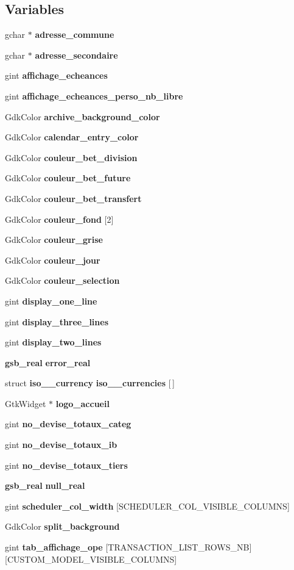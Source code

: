 \subsection*{Variables}
\begin{DoxyCompactItemize}
\item 
gchar $\ast$ {\bf adresse\_\-commune}
\item 
gchar $\ast$ {\bf adresse\_\-secondaire}
\item 
gint {\bf affichage\_\-echeances}
\item 
gint {\bf affichage\_\-echeances\_\-perso\_\-nb\_\-libre}
\item 
GdkColor {\bf archive\_\-background\_\-color}
\item 
GdkColor {\bf calendar\_\-entry\_\-color}
\item 
GdkColor {\bf couleur\_\-bet\_\-division}
\item 
GdkColor {\bf couleur\_\-bet\_\-future}
\item 
GdkColor {\bf couleur\_\-bet\_\-transfert}
\item 
GdkColor {\bf couleur\_\-fond} [2]
\item 
GdkColor {\bf couleur\_\-grise}
\item 
GdkColor {\bf couleur\_\-jour}
\item 
GdkColor {\bf couleur\_\-selection}
\item 
gint {\bf display\_\-one\_\-line}
\item 
gint {\bf display\_\-three\_\-lines}
\item 
gint {\bf display\_\-two\_\-lines}
\item 
{\bf gsb\_\-real} {\bf error\_\-real}
\item 
struct {\bf iso\_\_\-currency} {\bf iso\_\_\-currencies} [$\,$]
\item 
GtkWidget $\ast$ {\bf logo\_\-accueil}
\item 
gint {\bf no\_\-devise\_\-totaux\_\-categ}
\item 
gint {\bf no\_\-devise\_\-totaux\_\-ib}
\item 
gint {\bf no\_\-devise\_\-totaux\_\-tiers}
\item 
{\bf gsb\_\-real} {\bf null\_\-real}
\item 
gint {\bf scheduler\_\-col\_\-width} [SCHEDULER\_\-COL\_\-VISIBLE\_\-COLUMNS]
\item 
GdkColor {\bf split\_\-background}
\item 
gint {\bf tab\_\-affichage\_\-ope} [TRANSACTION\_\-LIST\_\-ROWS\_\-NB][CUSTOM\_\-MODEL\_\-VISIBLE\_\-COLUMNS]

\end{DoxyCompactItemize}
